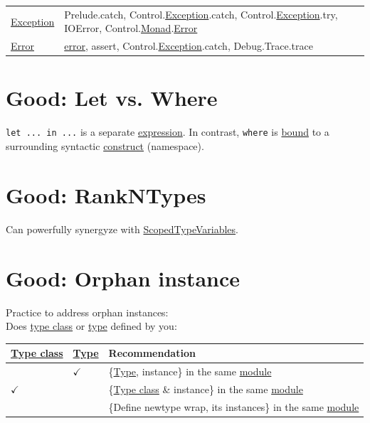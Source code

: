 \documentclass[a4paper,14pt,oneside]{book}
\begin{document}
\begin{center}
\begin{tabular}{ll}
\hline
\hyperref[org3882403]{Exception} & Prelude.catch, Control.\hyperref[org3882403]{Exception}.catch, Control.\hyperref[org3882403]{Exception}.try, IOError, Control.\hyperref[org026d995]{Monad}.\hyperref[orgdbf9386]{Error}\\
\hyperref[orgdbf9386]{Error} & \hyperref[orgdbf9386]{error}, assert, Control.\hyperref[org3882403]{Exception}.catch, Debug.Trace.trace\\
\end{tabular}
\end{center}

\chapter{\label{org54baeb2}Good: Let vs. Where}
\label{sec:orgb194f48}
\texttt{let ... in ...} is a separate \hyperref[orga5d93ed]{expression}. In contrast, \texttt{where} is \hyperref[org11c4132]{bound} to a surrounding syntactic \hyperref[org8facea2]{construct} (namespace).\\

\chapter{\label{org2a25123}Good: RankNTypes}
\label{sec:orgc3a931f}
Can powerfully synergyze with \hyperref[org9f9a547]{ScopedTypeVariables}.\\

\chapter{\label{org1afe7bd}Good: Orphan instance}
\label{sec:org8392964}
Practice to address orphan instances:\\

Does \hyperref[orgd08ec75]{type class} or \hyperref[org38dea24]{type} defined by you:\\
\begin{center}
\begin{tabular}{lll}
\hyperref[orgd08ec75]{Type class} & \hyperref[org38dea24]{Type} & Recommendation\\
\hline
 & \(\checkmark\) & \{\hyperref[org38dea24]{Type}, instance\} in the same \hyperref[org882d253]{module}\\
\(\checkmark\) &  & \{\hyperref[orgd08ec75]{Type class} \& instance\} in the same \hyperref[org882d253]{module}\\
 &  & \{Define newtype wrap, its instances\} in the same \hyperref[org882d253]{module}\\
\end{tabular}
\end{center}
\end{document}
